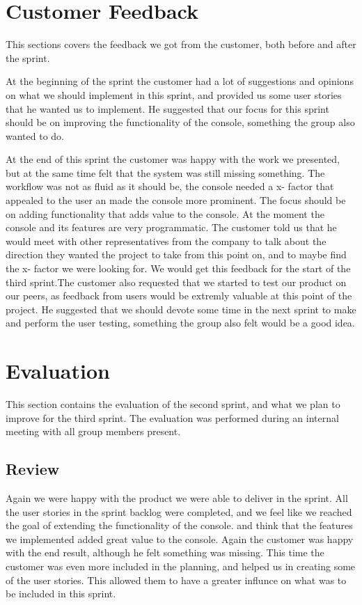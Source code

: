 \section{Customer Feedback}
This sections covers the feedback we got from the customer, both before and after the sprint.

At the beginning of the sprint the customer had a lot of suggestions and opinions on what we should implement in this sprint, and provided us some user stories that he wanted us to implement. He suggested that our focus for this sprint should be on improving the functionality of the console, something the group also wanted to do. 

At the end of this sprint the customer was happy with the work we presented, but at the same time felt that the system was still missing something. The workflow was not as fluid as it should be, the console needed a x- factor that appealed to the user an made the console more prominent. The focus should be on adding functionality that adds value to the console. At the moment the console and its features are very programmatic. The customer told us that he would meet with other representatives from the company to talk about the direction they wanted the project to take from this point on, and to maybe find the x- factor we were looking for. We would get this feedback for the start of the third sprint.The customer also requested that we started to test our product on our peers, as feedback from users would be extremly valuable at this point of the project. He suggested that we should devote some time in the next sprint to make and perform the user testing, something the group also felt would be a good idea.

\section{Evaluation}
This section contains the evaluation of the second sprint, and what we plan to improve for the third sprint. The evaluation was performed during an internal meeting with all group members present.

\subsection{Review}

Again we were happy with the product we were able to deliver in the sprint. All the user stories in the sprint backlog were completed, and we feel like we reached the goal of extending the functionality of the console. and think that the features we implemented added great value to the console. Again the customer was happy with the end result, although he felt something was missing. This time the customer was even more included in the planning, and helped us in creating some of the user stories. This allowed them to have a greater influnce on what was to be included in this sprint.

